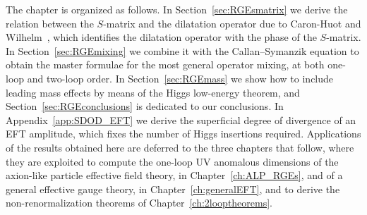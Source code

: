 The chapter is organized as follows. In Section~\ref{sec:RGEsmatrix} we derive the relation between
the $S$-matrix and the dilatation operator due to Caron-Huot and Wilhelm~\cite{Caron-Huot:2016cwu},
which identifies the dilatation operator with the phase of the $S$-matrix. In
Section~\ref{sec:RGEmixing} we combine it with the Callan--Symanzik equation to obtain the master
formulae for the most general operator mixing, at both one-loop and two-loop order. In
Section~\ref{sec:RGEmass} we show how to include leading mass effects by means of the Higgs
low-energy theorem, and Section~\ref{sec:RGEconclusions} is dedicated to our conclusions. In
Appendix~\ref{app:SDOD_EFT} we derive the superficial degree of divergence of an EFT amplitude, which
fixes the number of Higgs insertions required. Applications of the results obtained here are deferred to the three chapters that follow, where they are exploited to compute the one-loop UV anomalous dimensions of the axion-like particle effective field theory, in Chapter~\ref{ch:ALP_RGEs}, and of a general effective gauge theory, in Chapter~\ref{ch:generalEFT}, and to derive the non-renormalization theorems of Chapter~\ref{ch:2looptheorems}.

